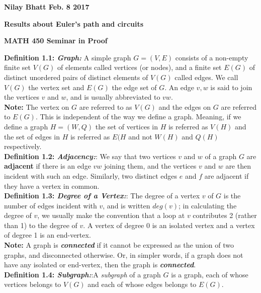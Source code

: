\documentclass[12pt, fullpage]{article}
\begin{document}
\begin{flushleft}
\textbf{Nilay Bhatt Feb. 8 2017}		
\end{flushleft}
\begin{center}
	\textbf{Results about Euler's path and circuits}
\end{center}
\begin{center}
		
{\bf MATH 450 Seminar in Proof}
 \\
\end{center}
\textbf{Definition 1.1: \textit{Graph: }}A simple graph $G = (V,E)$ consists of a non-empty finite set $V(G)$ of elements called vertices
(or nodes), and a finite set $E(G)$ of distinct unordered pairs of distinct elements of $V(G)$
called edges. We call $V(G)$ the vertex set and $E(G)$ the edge set of $G$. An edge ${v, w}$
is said to join the vertices $v$ and $w$, and is usually abbreviated to $vw$. \\
\textbf{Note:}	The vertex on $G$ are referred to as $V(G)$ and the edges on $G$ are referred to $E(G)$. This is independent of the way we define a graph. Meaning, if we define a graph $H = (W,Q)$ the set of vertices in $H$ is referred as $V(H)$ and the set of edges in $H$ is referred as $E(H$ and not $W(H)$ and  $Q(H)$ respectively.\\

\textbf{Definition 1.2: \textit{Adjacency:}}: We say that two vertices $v$ and $w$ of a graph $G$ are \textbf{adjacent} if there is an edge $vw$ joining
them, and the vertices $v$ and $w$ are then incident with such an edge. Similarly, two
distinct edges $e$ and $f$ are adjacent if they have a vertex in common.\\

\textbf{Definition 1.3: \textit{Degree of a Vertex:}}: The degree of a vertex $v$ of $G$ is the number of edges incident with $v$, and is written
$deg(v)$; in calculating the degree of $v$, we usually make the convention that a loop at $v$
contributes 2 (rather than 1) to the degree of $v$. A vertex of degree 0 is an isolated vertex and a vertex of degree 1 is an end-vertex.\\
\textbf{Note:} A graph is \textit{\textbf{connected}} if it cannot be expressed as the union of two graphs, and disconnected otherwise. Or, in simpler words, if a graph does not have any isolated or end-vertex, then the graph is \textit{\textbf{connected}}. \\

\textbf{Definition 1.4: \textit{Subgraph:}}:A \textit{subgraph} of a graph $G$ is a graph, each of whose vertices belongs to $V(G)$ and each of whose edges belongs to $E(G)$.\\
\end{document}
